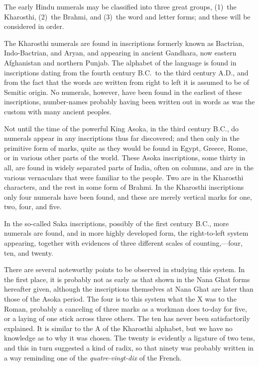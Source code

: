 \documentclass[11pt,a4paper]{article}
\begin{document}
The early Hindu numerals may be classified into three great groups, (1)~the Kharosthi, (2)~the Brahmi, and (3)~the word and letter forms; and these will be considered in order.

The Kharosthi numerals are found in inscriptions formerly known as Bactrian, Indo-Bactrian, and Aryan, and appearing in ancient Gandhara, now eastern Afghanistan and northern Punjab. The alphabet of the language is found in inscriptions dating from the fourth century B.C.\ to the third century A.D., and from the fact that the words are written from right to left it is assumed to be of Semitic origin. No numerals, however, have been found in the earliest of these inscriptions, number-names probably having been written out in words as was the custom with many ancient peoples.

Not until the time of the powerful King Asoka, in the third century B.C., do numerals appear in any inscriptions thus far discovered; and then only in the primitive form of marks, quite as they would be found in Egypt, Greece, Rome, or in various other parts of the world. These Asoka inscriptions, some thirty in all, are found in widely separated parts of India, often on columns, and are in the various vernaculars that were familiar to the people. Two are in the Kharosthi characters, and the rest in some form of Brahmi. In the Kharosthi inscriptions only four numerals have been found, and these are merely vertical marks for one, two, four, and five.

In the so-called Saka inscriptions, possibly of the first century B.C., more numerals are found, and in more highly developed form, the right-to-left system appearing, together with evidences of three different scales of counting,---four, ten, and twenty.

There are several noteworthy points to be observed in studying this system. In the first place, it is probably not as early as that shown in the Nana Ghat forms hereafter given, although the inscriptions themselves at Nana Ghat are later than those of the Asoka period. The four is to this system what the X was to the Roman, probably a canceling of three marks as a workman does to-day for five, or a laying of one stick across three others. The ten has never been satisfactorily explained. It is similar to the A of the Kharosthi alphabet, but we have no knowledge as to why it was chosen. The twenty is evidently a ligature of two tens, and this in turn suggested a kind of radix, so that ninety was probably written in a way reminding one of the \textit{quatre-vingt-dix} of the French.
\end{document}
